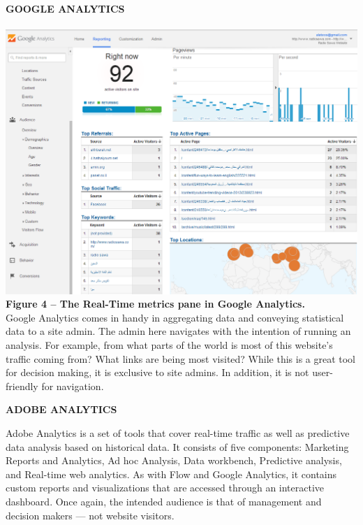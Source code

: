 \documentclass[12pt]{article}
\begin{document}
\noindent\textbf{GOOGLE ANALYTICS} \\ \\
\noindent\includegraphics[scale=0.4]{img/google_analytics} \\
\noindent\textbf{Figure 4 -- The Real-Time metrics pane in Google Analytics.} \\

Google Analytics comes in handy in aggregating data and conveying statistical data to a site admin. The admin here navigates with the intention of running an analysis. For example, from what parts of the world is most of this website's traffic coming from? What links are being most visited?
While this is a great tool for decision making, it is exclusive to site admins. In addition, it is not user-friendly for navigation. \\

\newpage

\noindent\textbf{ADOBE ANALYTICS}

Adobe Analytics is a set of tools that cover real-time traffic as well as predictive data analysis based on historical data. It consists of five components: Marketing Reports and Analytics, Ad hoc Analysis, Data workbench, Predictive analysis, and Real-time web analytics. As with Flow and Google Analytics, it contains custom reports and visualizations that are accessed through an interactive dashboard. Once again, the intended audience is that of management and decision makers --- not website visitors. \\
\end{document}
